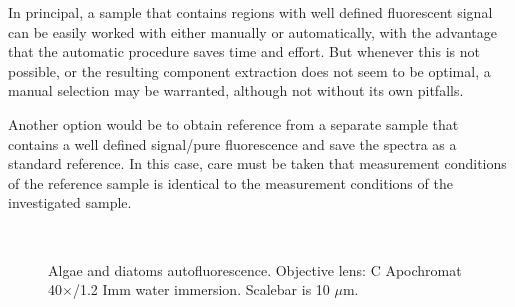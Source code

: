 In principal, a sample that contains regions with well defined fluorescent signal can be easily worked with either manually or automatically, with the advantage that the automatic procedure saves time and effort. 
But whenever this is not possible, or the resulting component extraction does not seem to be optimal, a manual selection may be warranted, although not without its own pitfalls. 

Another option would be to obtain reference from a separate sample that contains a well defined signal/pure fluorescence and save the spectra as a standard reference. In this case, care must be taken that measurement conditions of the reference sample is identical to the measurement conditions of the investigated sample. 

\begin{figure}[h!]
\centering
{}\hspace{0.1em}
\hspace{0.1em}
\\
\caption{Algae and diatoms autofluorescence. 
Objective lens: C Apochromat 40$\times$/1.2 Imm water immersion. 
Scalebar is 10 $\mu$m.}
\label{fig:diatalg}
\end{figure}

